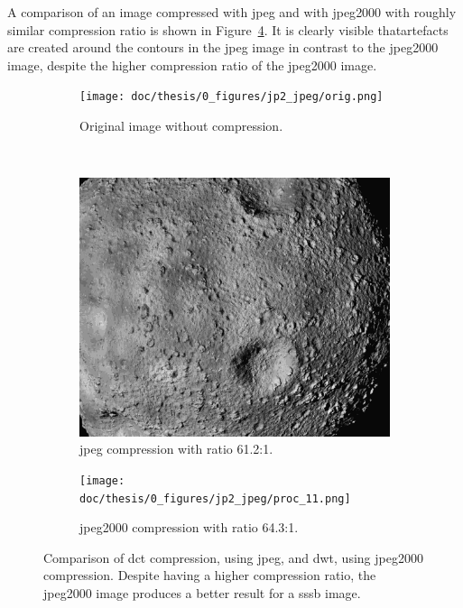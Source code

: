 A comparison of an image compressed with \gls{jpeg} and with \gls{jpeg}2000 with roughly similar compression ratio is shown in Figure~\ref{fig:jpg_jp2_comparison}. It is clearly visible thatartefacts are created around the contours in the \gls{jpeg} image in contrast to the \gls{jpeg}2000 image, despite the higher compression ratio of the \gls{jpeg}2000 image.
\begin{figure}[htb]
    \centering
    \begin{subfigure}[b]{0.7\textwidth}
        \texttt{[image: doc/thesis/0\_figures/jp2\_jpeg/orig.png]}
        \caption{Original image without compression.}
        \label{fig:jpg_jp2_oirg}
    \end{subfigure}
    \\
    \begin{subfigure}[b]{0.48\textwidth}
        \includegraphics[width=\textwidth]{doc/thesis/0_figures/jp2_jpeg/proc_5.jpg}
        \caption{\Gls{jpeg} compression with ratio 61.2:1.}
        \label{fig:jpg_jp2_jpeg}
    \end{subfigure}
    \begin{subfigure}[b]{0.48\textwidth}
        \texttt{[image: doc/thesis/0\_figures/jp2\_jpeg/proc\_11.png]}
        \caption{\Gls{jpeg}2000 compression with ratio 64.3:1.}
        \label{fig:jpg_jp2_jp2}
    \end{subfigure}
    \caption{Comparison of \gls{dct} compression, using \gls{jpeg}, and \gls{dwt}, using \gls{jpeg}2000 compression. Despite having a higher compression ratio, the \gls{jpeg}2000 image produces a better result for a \gls{sssb} image.}
    \label{fig:jpg_jp2_comparison}
\end{figure}


